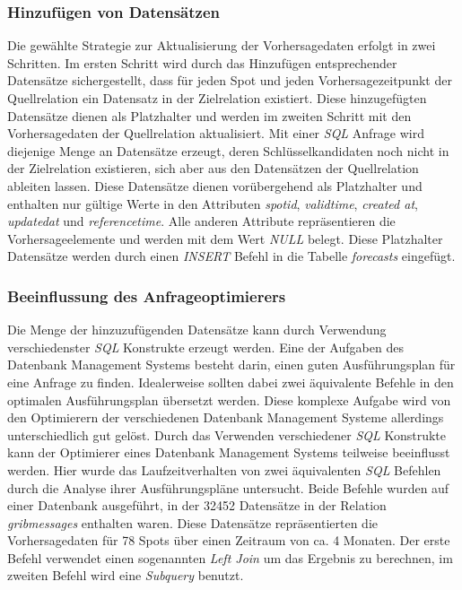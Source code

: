\subsubsection{Hinzufügen von Datensätzen}
Die gewählte Strategie zur Aktualisierung der Vorhersagedaten erfolgt
in zwei Schritten. Im ersten Schritt wird durch das Hinzufügen
entsprechender Datensätze sichergestellt, dass für jeden Spot und
jeden Vorhersagezeitpunkt der Quellrelation ein Datensatz in der
Zielrelation existiert. Diese hinzugefügten Datensätze dienen als
Platzhalter und werden im zweiten Schritt mit den Vorhersagedaten der
Quellrelation aktualisiert. Mit einer \textit{SQL} Anfrage wird
diejenige Menge an Datensätze erzeugt, deren Schlüsselkandidaten noch
nicht in der Zielrelation existieren, sich aber aus den Datensätzen
der Quellrelation ableiten lassen. Diese Datensätze dienen
vorübergehend als Platzhalter und enthalten nur gültige Werte in den
Attributen \textit{spot\textunderscore id},
\textit{valid\textunderscore time}, \textit{created\textunderscore
  at}, \textit{updated\textunderscore at} und
\textit{reference\textunderscore time}. Alle anderen Attribute
repräsentieren die Vorhersageelemente und werden mit dem Wert
\textit{NULL} belegt. Diese Platzhalter Datensätze werden durch einen
\textit{INSERT} Befehl in die Tabelle \textit{forecasts} eingefügt.

\subsubsection{Beeinflussung des Anfrageoptimierers}
Die Menge der hinzuzufügenden Datensätze kann durch Verwendung
verschiedenster \textit{SQL} Konstrukte erzeugt werden. Eine der
Aufgaben des Datenbank Management Systems besteht darin, einen guten
Ausführungsplan für eine Anfrage zu finden. Idealerweise sollten dabei
zwei äquivalente Befehle in den optimalen Ausführungsplan übersetzt
werden. Diese komplexe Aufgabe wird von den Optimierern der
verschiedenen Datenbank Management Systeme allerdings unterschiedlich
gut gelöst. Durch das Verwenden verschiedener \textit{SQL} Konstrukte
kann der Optimierer eines Datenbank Management Systems teilweise
beeinflusst werden. Hier wurde das Laufzeitverhalten von zwei
äquivalenten \textit{SQL} Befehlen durch die Analyse ihrer
Ausführungspläne untersucht. Beide Befehle wurden auf einer Datenbank
ausgeführt, in der 32452 Datensätze in der Relation
\textit{grib\textunderscore messages} enthalten waren. Diese
Datensätze repräsentierten die Vorhersagedaten für 78 Spots über einen
Zeitraum von ca. 4 Monaten. Der erste Befehl verwendet einen
sogenannten \textit{Left Join} um das Ergebnis zu berechnen, im
zweiten Befehl wird eine \textit{Subquery} benutzt.

